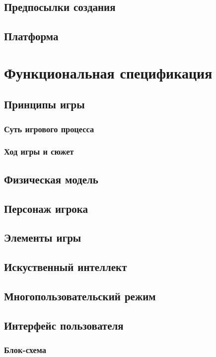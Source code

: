 \documentclass[article,12pt, fleqn]{article}
\begin{document}
\begin{itemize}
\subsection{Предпосылки создания}

\subsection{Платформа}

\section{Функциональная спецификация}

\subsection{Принципы игры}

\subsubsection{Суть игрового процесса}

\subsubsection{Ход игры и сюжет}
\subsection{Физическая модель}
\subsection{Персонаж игрока}
\subsection{Элементы игры}
\subsection{Искуственный интеллект}
\subsection{Многопользовательский режим}
\subsection{Интерфейс пользователя}
\subsubsection{Блок-схема}

\end{itemize}
\end{document}
